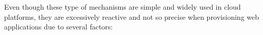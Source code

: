 


Even though these type of mechanisms are simple and widely used in cloud platforms, they are excessively reactive and not so precise when provisioning web applications due to several factors: 



